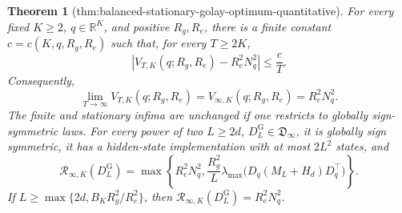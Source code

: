 \documentclass{article}
\newtheorem{theorem}{Theorem}
\begin{document}
\begin{theorem}[thm:balanced-stationary-golay-optimum-quantitative]\label{thm:balanced-stationary-golay-optimum-quantitative}
For every fixed \(K\ge2\), \(q\in\mathbb R^K\), and positive \(R_g,R_e\), there is a finite constant \(c=c(K,q,R_g,R_e)\) such that, for every \(T\ge2K\),
\[
\left|V_{T,K}(q;R_g,R_e)-R_e^2N_q^2\right|\le\frac{c}{T}.
\]
Consequently,
\[
\lim_{T\to\infty}V_{T,K}(q;R_g,R_e)
=V_{\infty,K}(q;R_g,R_e)=R_e^2N_q^2.
\]
The finite and stationary infima are unchanged if one restricts to globally sign-symmetric laws.  For every power of two \(L\ge2d\), \(D_L^{\mathrm G}\in\mathfrak D_{\infty}\), it is globally sign symmetric, it has a hidden-state implementation with at most \(2L^2\) states, and
\[
\mathcal R_{\infty,K}(D_L^{\mathrm G})
=\max\!\left\{R_e^2N_q^2,
\frac{R_g^2}{L}\lambda_{\max}\!\bigl(D_q(M_L+H_d)D_q^{\top}\bigr)\right\}.
\]
If \(L\ge\max\{2d,B_KR_g^2/R_e^2\}\), then \(\mathcal R_{\infty,K}(D_L^{\mathrm G})=R_e^2N_q^2\).
\end{theorem}
\end{document}

